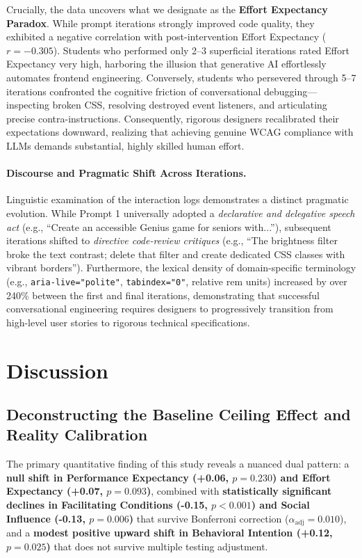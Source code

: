 \documentclass{cleiej}
\begin{document}
Crucially, the data uncovers what we designate as the \textbf{Effort Expectancy Paradox}. While prompt iterations strongly improved code quality, they exhibited a negative correlation with post-intervention Effort Expectancy ($r = -0.305$). Students who performed only 2--3 superficial iterations rated Effort Expectancy very high, harboring the illusion that generative AI effortlessly automates frontend engineering. Conversely, students who persevered through 5--7 iterations confronted the cognitive friction of conversational debugging---inspecting broken CSS, resolving destroyed event listeners, and articulating precise contra-instructions. Consequently, rigorous designers recalibrated their expectations downward, realizing that achieving genuine WCAG compliance with LLMs demands substantial, highly skilled human effort.

\paragraph{Discourse and Pragmatic Shift Across Iterations.}
Linguistic examination of the interaction logs demonstrates a distinct pragmatic evolution. While Prompt 1 universally adopted a \textit{declarative and delegative speech act} (e.g., ``Create an accessible Genius game for seniors with...''), subsequent iterations shifted to \textit{directive code-review critiques} (e.g., ``The brightness filter broke the text contrast; delete that filter and create dedicated CSS classes with vibrant borders''). Furthermore, the lexical density of domain-specific terminology (e.g., \texttt{aria-live="polite"}, \texttt{tabindex="0"}, relative rem units) increased by over 240\% between the first and final iterations, demonstrating that successful conversational engineering requires designers to progressively transition from high-level user stories to rigorous technical specifications.

\section{Discussion}
\label{sec:discussion}

\subsection{Deconstructing the Baseline Ceiling Effect and Reality Calibration}
The primary quantitative finding of this study reveals a nuanced dual pattern: a \textbf{null shift in Performance Expectancy (+0.06, $p = 0.230$) and Effort Expectancy (+0.07, $p = 0.093$)}, combined with \textbf{statistically significant declines in Facilitating Conditions (-0.15, $p < 0.001$) and Social Influence (-0.13, $p = 0.006$)} that survive Bonferroni correction ($\alpha_{\text{adj}} = 0.010$), and a \textbf{modest positive upward shift in Behavioral Intention (+0.12, $p = 0.025$)} that does not survive multiple testing adjustment.
\end{document}

